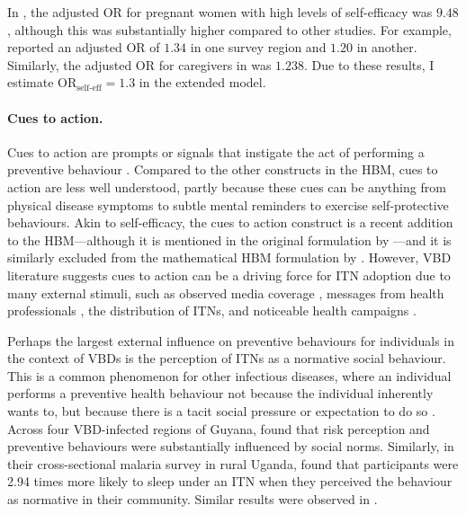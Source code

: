 In \citet{kakaire_role_2023}, the adjusted OR for pregnant women with high levels of self-efficacy was $9.48$, although this was substantially higher compared to other studies. For example, \citet{storey_associations_2018} reported an adjusted OR of $1.34$ in one survey region and $1.20$ in another. Similarly, the adjusted OR for caregivers in \citet{babalola_factors_2018} was $1.238$. Due to these results, I estimate $\text{OR}_{\text{self-eff}}=1.3$ in the extended model.


\paragraph{Cues to action.}Cues to action are prompts or signals that instigate the act of performing a preventive behaviour \cite{champion_health_2015}. Compared to the other constructs in the HBM, cues to action are less well understood, partly because these cues can be anything from physical disease symptoms to subtle mental reminders to exercise self-protective behaviours. Akin to self-efficacy, the cues to action construct is a recent addition to the HBM---although it is mentioned in the original formulation by \citet{hochbaum_public_1958}---and it is similarly excluded from the mathematical HBM formulation by \citet{durham_incorporating_2012}. However, VBD literature suggests cues to action can be a driving force for ITN adoption due to many external stimuli, such as observed media coverage \cite{storey_associations_2018}, messages from health professionals \cite{yirsaw_insecticide-treated_2021}, the distribution of ITNs, and noticeable health campaigns \cite{watanabe_determinants_2014}.

Perhaps the largest external influence on preventive behaviours for individuals in the context of VBDs is the perception of ITNs as a normative social behaviour. This is a common phenomenon for other infectious diseases, where an individual performs a preventive health behaviour not because the individual inherently wants to, but because there is a tacit social pressure or expectation to do so \cite{perkins_agent-based_2019}. Across four VBD-infected regions of Guyana, \citet{lopes-rafegas_contribution_2023} found that risk perception and preventive behaviours were substantially influenced by social norms. Similarly, in their cross-sectional malaria survey in rural Uganda, \citet{perkins_agent-based_2019} found that participants were 2.94 times more likely to sleep under an ITN when they perceived the behaviour as normative in their community. Similar results were observed in \citet{storey_associations_2018, phok_behavioural_2022}.

